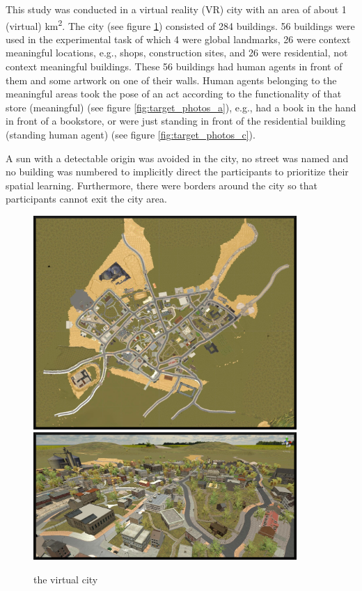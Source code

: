 This study was conducted in a virtual reality (VR) city with an area of about 1 (virtual) km\textsuperscript2. The city (see figure \ref{fig:city}) consisted of 284 buildings. 56 buildings were used in the experimental task of which 4 were global landmarks, 26 were {\emphasize context meaningful} locations, e.g., shops, construction sites, and 26 were residential, {\emphasize not context meaningful} buildings. These 56 buildings had human agents in front of them and some artwork on one of their walls. Human agents belonging to the meaningful areas took the pose of an act according to the functionality of that store {\emphasize(meaningful)} (see figure \ref{fig:target_photos_a}), e.g., had a book in the hand in front of a bookstore, or were just standing in front of the residential building {\emphasize(standing human agent)} (see figure \ref{fig:target_photos_c}). 

A sun with a detectable origin was avoided in the city, no street was named and no building was numbered to implicitly direct the participants to prioritize their spatial learning. Furthermore, there were borders around the city so that participants cannot exit the city area.

\begin{figure}[!htb]
	\centering
	\includegraphics[width=100mm]{figures/city.jpg}
	\includegraphics[width=100mm]{figures/city_1.jpg}
	\caption[The virtual city]{the virtual city}
	\label{fig:city}
\end{figure}

